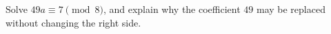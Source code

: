 Solve $49a\equiv7\pmod8$, and explain why the coefficient $49$ may be replaced without changing the right side.
